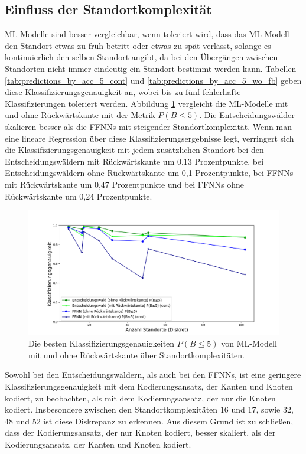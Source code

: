 \subsection{Einfluss der Standortkomplexität}
ML-Modelle sind besser vergleichbar, wenn toleriert wird, dass das ML-Modell den Standort etwas zu früh betritt oder etwas zu spät verlässt,
solange es kontinuierlich den selben Standort angibt, da bei den Übergängen zwischen Standorten nicht immer eindeutig ein Standort bestimmt werden kann.
Tabellen \ref{tab:predictions_by_acc_5_cont} und \ref{tab:predictions_by_acc_5_wo_fb} geben diese Klassifizierungsgenauigkeit an,
wobei bis zu fünf fehlerhafte Klassifizierungen toleriert werden.
\newline
\newline
Abbildung \ref{fig:best_dt_vs_knn_pb_5_vs_pb_5_cont} vergleicht die ML-Modelle mit und ohne Rückwärtskante mit der Metrik $P(B\leq5)$.
Die Entscheidungswälder skalieren besser als die FFNNs mit steigender Standortkomplexität.
Wenn man eine lineare Regression über diese Klassifizierungsergebnisse legt,
verringert sich die Klassifizierungsgenauigkeit mit jedem zusätzlichen Standort bei den Entscheidungswäldern mit Rückwärtskante um 0,13 Prozentpunkte,
bei Entscheidungswäldern ohne Rückwärtskante um 0,1 Prozentpunkte,
bei FFNNs mit Rückwärtskante um 0,47 Prozentpunkte und bei FFNNs ohne Rückwärtskante um 0,24 Prozentpunkte.
\begin{figure}[h!]
    \centering
    \includegraphics[width=\linewidth]{images/best_dt_vs_knn_pb_5_vs_pb_5_cont.png}
    \caption{Die besten Klassifizierungsgenauigkeiten $P(B\leq5)$ von ML-Modell mit und ohne Rückwärtskante über Standortkomplexitäten.}
    \label{fig:best_dt_vs_knn_pb_5_vs_pb_5_cont}
\end{figure}
\newline
\newline
Sowohl bei den Entscheidungswäldern, als auch bei den FFNNs, ist eine geringere Klassifizierungsgenauigkeit mit dem Kodierungsansatz, der Kanten und Knoten kodiert,
zu beobachten, als mit dem Kodierungsansatz, der nur die Knoten kodiert.
Insbesondere zwischen den Standortkomplexitäten 16 und 17, sowie 32, 48 und 52 ist diese Diskrepanz zu erkennen.
Aus diesem Grund ist zu schließen, dass der Kodierungsansatz, der nur Knoten kodiert, besser skaliert, als der Kodierungsansatz, der Kanten und Knoten kodiert.

